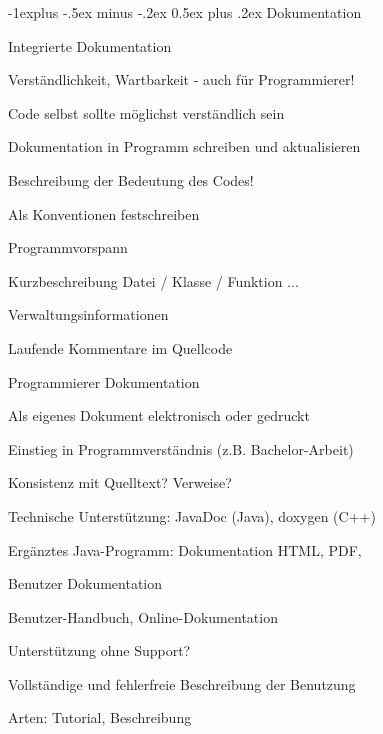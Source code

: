 \documentclass[a4paper]{article}
\makeatletter
\renewcommand{\subsection}{\@startsection{subsection}{2}{0mm}%
                                {-1explus -.5ex minus -.2ex}%
                                {0.5ex plus .2ex}%
                                {\normalfont\normalsize\bfseries}}
\makeatother
\begin{document}
\begin{multicols}{3}
  \subsection{Dokumentation}
  \begin{description*}
    \item[Integrierte] Dokumentation
    \begin{itemize*}
      \item Verständlichkeit, Wartbarkeit - auch für Programmierer!
      \item Code selbst sollte möglichst verständlich sein
      \item Dokumentation in Programm schreiben und aktualisieren
      \item Beschreibung der Bedeutung des Codes!
      \item Als Konventionen festschreiben
      \item Programmvorspann
      \item Kurzbeschreibung Datei / Klasse / Funktion ...
      \item Verwaltungsinformationen
      \item Laufende Kommentare im Quellcode
    \end{itemize*}
    \item[Programmierer] Dokumentation
    \begin{itemize*}
      \item Als eigenes Dokument elektronisch oder gedruckt
      \item Einstieg in Programmverständnis (z.B. Bachelor-Arbeit)
      \item Konsistenz mit Quelltext? Verweise?
      \item Technische Unterstützung: JavaDoc (Java), doxygen (C++)
      \item Ergänztes Java-Programm: Dokumentation HTML, PDF,
    \end{itemize*}
    \item[Benutzer] Dokumentation
    \begin{itemize*}
      \item Benutzer-Handbuch, Online-Dokumentation
      \item Unterstützung ohne Support?
      \item Vollständige und fehlerfreie Beschreibung der Benutzung
      \item Arten: Tutorial, Beschreibung
    \end{itemize*}
  \end{description*}


\end{multicols}
\end{document}
